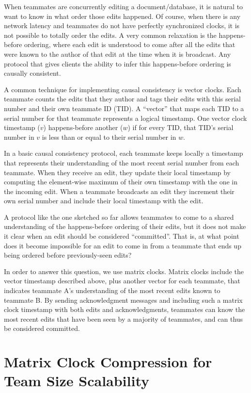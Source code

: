 \documentclass[runningheads]{llncs}
\begin{document}
When teammates are concurrently editing a document{\slash}database, it is natural to want to know in what order those edits happened.
Of course, when there is any network latency and teammates do not have perfectly synchronized clocks, it is not possible to totally order the edits.
A very common relaxation is the happens-before ordering, where each edit is understood to come after all the edits that were known to the author of that edit at the time when it is broadcast.
Any protocol that gives clients the ability to infer this happens-before ordering is causally consistent.

A common technique for implementing causal consistency is vector clocks.
Each teammate counts the edits that they author and tags their edits with this serial number and their own teammate ID (TID).
A ``vector'' that maps each TID to a serial number for that teammate represents a logical timestamp.
One vector clock timestamp ($v$) happens-before another ($w$) if for every TID, that TID's serial number in $v$ is less than or equal to their serial number in $w$.

In a basic causal consistency protocol, each teammate keeps locally a timestamp that represents their understanding of the most recent serial number from each teammate.
When they receive an edit, they update their local timestamp by computing the element-wise maximum of their own timestamp with the one in the incoming edit.
When a teammate broadcasts an edit they increment their own serial number and include their local timestamp with the edit.

A protocol like the one sketched so far allows teammates to come to a shared understanding of the happens-before ordering of their edits, but it does not make it clear when an edit should be considered ``committed''.
That is, at what point does it become impossible for an edit to come in from a teammate that ends up being ordered before previously-seen edits?

In order to answer this question, we use matrix clocks.
Matrix clocks include the vector timestamp described above, plus another vector for each teammate, that indicates teammate A's understanding of the most recent edits known to teammate B.
By sending acknowledgment messages and including such a matrix clock timestamp with both edits and acknowledgments, teammates can know the most recent edits that have been seen by a majority of teammates, and can thus be considered committed.

\section{Matrix Clock Compression for Team Size Scalability}
\end{document}
